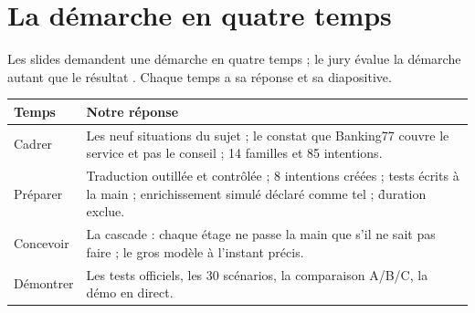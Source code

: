 \section{La démarche en quatre temps}

Les slides demandent une démarche en quatre temps ; le jury \og évalue la démarche autant que le
résultat \fg. Chaque temps a sa réponse et sa diapositive.

\begin{center}\small
\begin{tabularx}{\textwidth}{@{}l Y@{}}
\toprule
\textbf{Temps} & \textbf{Notre réponse} \\
\midrule
Cadrer & Les neuf situations du sujet ; le constat que Banking77 couvre le service et pas le
  conseil ; 14 familles et 85 intentions. \\
Préparer & Traduction outillée et contrôlée ; 8 intentions créées ; tests écrits à la main ;
  enrichissement simulé déclaré comme tel ; \f{duration} exclue. \\
Concevoir & La cascade : chaque étage ne passe la main que s'il ne sait pas faire ; le gros modèle
  à l'instant précis. \\
Démontrer & Les tests officiels, les 30 scénarios, la comparaison A/B/C, la démo en direct. \\
\bottomrule
\end{tabularx}
\end{center}
